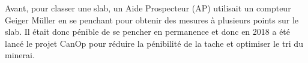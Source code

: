 Avant, pour classer une slab, un Aide Prospecteur (AP) utilisait un compteur Geiger Müller en se penchant pour obtenir des mesures à plusieurs points sur le slab. Il était donc pénible de se pencher en permanence et donc en 2018 a été lancé le projet CanOp pour réduire la pénibilité de la tache et optimiser le tri du minerai.
